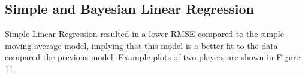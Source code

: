 \documentclass[a4paper,11pt,twoside]{article}
\begin{document}
\subsection{Simple and Bayesian Linear Regression}

Simple Linear Regression resulted in a lower RMSE compared to the simple moving average model, implying that this model is a better fit to the data compared the previous model. Example plots of two players are shown in Figure 11. 


\begin{figure} [h!]
\captionsetup{justification=centering}
\end{figure}
\end{document}
